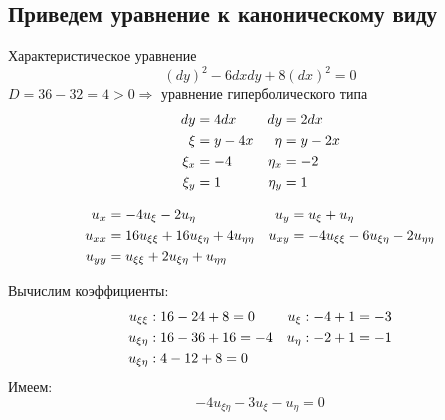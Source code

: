 \documentclass[a4paper,12pt]{article}
\begin{document}
    \subsection{Приведем уравнение к каноническому виду}
        Характеристическое уравнение
        $$(dy)^2 - 6dxdy + 8(dx)^2 = 0$$
        $D = 36-32 = 4 > 0 \Rightarrow$ уравнение гиперболического типа
        \begin{align}
            dy &= 4dx &dy &= 2dx \notag \\
            \xi &= y-4x &\eta &= y-2x \notag \\
            \xi_x &= -4 &\eta_x &=-2 \notag \\
            \xi_y &= 1 &\eta_y &= 1 \notag
        \end{align}

        \begin{align}
            u_x &= -4u_\xi - 2u_\eta &u_y &= u_\xi + u_\eta \notag \\
            u_{xx} &= 16u_{\xi\xi} + 16u_{\xi\eta} + 4u_{\eta\eta} &u_{xy} &= -4u_{\xi\xi} - 6u_{\xi\eta} - 2u_{\eta\eta} \notag \\
            u_{yy} &= u_{\xi\xi} + 2u_{\xi\eta} + u_{\eta\eta} \notag
        \end{align}

        Вычислим коэффициенты:
        \begin{align}
            u_{\xi\xi} &: 16-24+8=0 &u_\xi &: -4+1 = -3 \notag \\
            u_{\xi\eta} &: 16-36+16 = -4 &u_\eta &: -2+1 = -1 \notag\\
            u_{\xi\eta} &: 4-12+8 = 0 \notag
        \end{align}
        Имеем:
        $$-4u_{\xi\eta} - 3u_\xi - u_\eta = 0$$
\end{document}
